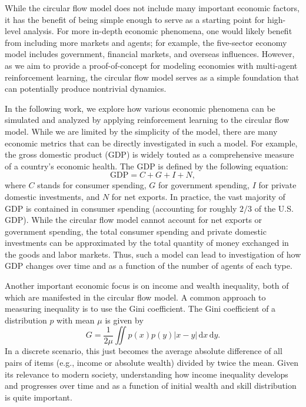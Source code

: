 \documentclass[twoside,twocolumn]{article}
\begin{document}
While the circular flow model does not include many important economic factors, it has the benefit of being simple enough to serve as a starting point for high-level analysis. For more in-depth economic phenomena, one would likely benefit from including more markets and agents; for example, the five-sector economy model includes government, financial markets, and overseas influences. However, as we aim to provide a proof-of-concept for modeling economies with multi-agent reinforcement learning, the circular flow model serves as a simple foundation that can potentially produce nontrivial dynamics.

\medskip

In the following work, we explore how various economic phenomena can be simulated and analyzed by applying reinforcement learning to the circular flow model. While we are limited by the simplicity of the model, there are many economic metrics that can be directly investigated in such a model. For example, the gross domestic product (GDP) is widely touted as a comprehensive measure of a country's economic health. The GDP is defined by the following equation:
\[
  \text{GDP} = C + G + I + N,
\]
where $C$ stands for consumer spending, $G$ for government spending, $I$ for private domestic investments, and $N$ for net exports. In practice, the vast majority of GDP is contained in consumer spending (accounting for roughly $2/3$ of the U.S. GDP). While the circular flow model cannot account for net exports or government spending, the total consumer spending and private domestic investments can be approximated by the total quantity of money exchanged in the goods and labor markets. Thus, such a model can lead to investigation of how GDP changes over time and as a function of the number of agents of each type.

\medskip

Another important economic focus is on income and wealth inequality, both of which are manifested in the circular flow model. A common approach to measuring inequality is to use the Gini coefficient. The Gini coefficient of a distribution $p$ with mean $\mu$ is given by 
\[
  G = \frac{1}{2\mu} \iint p(x)p(y)|x - y|\, \mathrm{d}x\, \mathrm{d}y.
\] 
In a discrete scenario, this just becomes the average absolute difference of all pairs of items (e.g., income or absolute wealth) divided by twice the mean. Given its relevance to modern society, understanding how income inequality develops and progresses over time and as a function of initial wealth and skill distribution is quite important.
\end{document}
